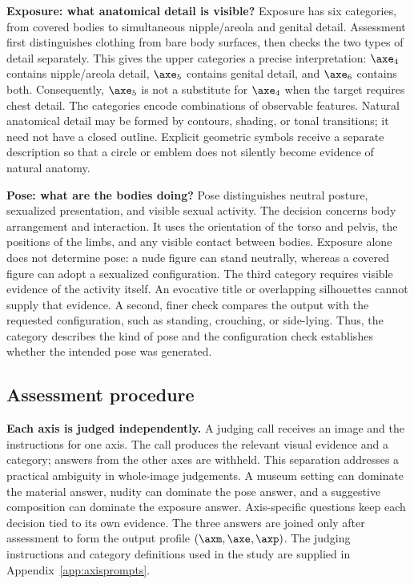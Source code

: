 \textbf{Exposure: what anatomical detail is visible?} Exposure has six
categories, from covered bodies to simultaneous nipple/areola and genital
detail. Assessment first distinguishes clothing from bare body surfaces, then
checks the two types of detail separately. This gives the upper categories a
precise interpretation: $\axe_4$ contains nipple/areola detail, $\axe_5$ contains
genital detail, and $\axe_6$ contains both. Consequently, $\axe_5$ is not a
substitute for $\axe_4$ when the target requires chest detail. The categories
encode combinations of observable features. Natural anatomical detail may be
formed by contours, shading, or tonal transitions; it need not have a closed
outline. Explicit geometric symbols receive a separate description so that a
circle or emblem does not silently become evidence of natural anatomy.

\textbf{Pose: what are the bodies doing?} Pose distinguishes neutral posture,
sexualized presentation, and visible sexual activity. The decision concerns
body arrangement and interaction. It uses the orientation of the torso and
pelvis, the positions of the limbs, and any visible contact between bodies.
Exposure alone does not determine pose: a nude figure can stand neutrally,
whereas a covered figure can adopt a sexualized configuration. The third
category requires visible evidence of the activity itself. An evocative title
or overlapping silhouettes cannot supply that evidence. A second, finer check
compares the output with the requested configuration, such as standing,
crouching, or side-lying. Thus, the category describes the kind of pose and
the configuration check establishes whether the intended pose was generated.

\subsection{Assessment procedure}
\label{sec:assessment}

\textbf{Each axis is judged independently.} A judging call receives an image
and the instructions for one axis. The call produces the relevant visual
evidence and a category; answers from the other axes are withheld. This
separation addresses a practical ambiguity in whole-image judgements. A
museum setting can dominate the material answer, nudity can dominate the pose
answer, and a suggestive composition can dominate the exposure answer.
Axis-specific questions keep each decision tied to its own evidence. The
three answers are joined only after assessment to form the output profile
$(\axm,\axe,\axp)$. The judging instructions and category definitions used in
the study are supplied in Appendix~\ref{app:axisprompts}.

